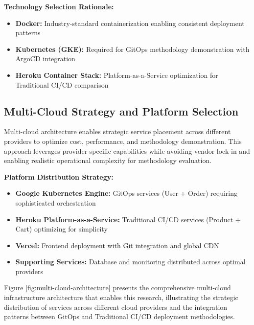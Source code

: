 \textbf{Technology Selection Rationale:}
\begin{itemize}
\item \textbf{Docker:} Industry-standard containerization enabling consistent deployment patterns
\item \textbf{Kubernetes (GKE):} Required for GitOps methodology demonstration with ArgoCD integration
\item \textbf{Heroku Container Stack:} Platform-as-a-Service optimization for Traditional CI/CD comparison
\end{itemize}

\subsection{Multi-Cloud Strategy and Platform Selection}

Multi-cloud architecture enables strategic service placement across different providers to optimize cost, performance, and methodology demonstration. This approach leverages provider-specific capabilities while avoiding vendor lock-in and enabling realistic operational complexity for methodology evaluation.

\textbf{Platform Distribution Strategy:}
\begin{itemize}
\item \textbf{Google Kubernetes Engine:} GitOps services (User + Order) requiring sophisticated orchestration
\item \textbf{Heroku Platform-as-a-Service:} Traditional CI/CD services (Product + Cart) optimizing for simplicity
\item \textbf{Vercel:} Frontend deployment with Git integration and global CDN
\item \textbf{Supporting Services:} Database and monitoring distributed across optimal providers
\end{itemize}

Figure \ref{fig:multi-cloud-architecture} presents the comprehensive multi-cloud infrastructure architecture that enables this research, illustrating the strategic distribution of services across different cloud providers and the integration patterns between GitOps and Traditional CI/CD deployment methodologies.

